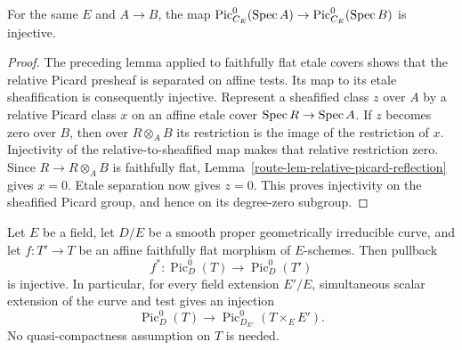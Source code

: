 \begin{lemma}
  \label{route-lem-pic0-affine-reflection}

  For the same \(E\) and \(A\to B\), the map
  \(\operatorname{Pic}^0_{C_E}(\operatorname{Spec} A)\to
    \operatorname{Pic}^0_{C_E}(\operatorname{Spec} B)\) is injective.
\end{lemma}

\begin{proof}
  The preceding lemma applied to faithfully flat etale covers shows that
  the relative Picard presheaf is separated on affine tests.  Its map to
  its etale sheafification is consequently injective.  Represent a
  sheafified class \(z\) over \(A\) by a relative Picard class \(x\)
  on an affine etale cover \(\operatorname{Spec} R\to\operatorname{Spec} A\).
  If \(z\) becomes zero over \(B\), then over \(R\otimes_A B\) its
  restriction is the image of the restriction of \(x\).
  Injectivity of the relative-to-sheafified map makes that relative
  restriction zero.  Since \(R\to R\otimes_A B\) is faithfully flat,
  Lemma~\ref{route-lem-relative-picard-reflection} gives \(x=0\).
  Etale separation now gives \(z=0\).  This proves injectivity on the
  sheafified Picard group, and hence on its degree-zero subgroup.
\end{proof}

\begin{lemma}
  \label{route-lem-pic0-field-reflection}
  \leanok

  Let \(E\) be a field, let \(D/E\) be a smooth proper geometrically
  irreducible curve, and let \(f:T'\to T\) be an affine faithfully
  flat morphism of \(E\)-schemes. Then pullback
  \[
    f^*:\operatorname{Pic}^0_D(T)\longrightarrow
      \operatorname{Pic}^0_D(T')
  \]
  is injective. In particular, for every field extension \(E'/E\),
  simultaneous scalar extension of the curve and test gives an injection
  \[
    \operatorname{Pic}^0_D(T)\longrightarrow
       \operatorname{Pic}^0_{D_{E'}}(T\times_E E').
  \]
  No quasi-compactness assumption on \(T\) is needed.
\end{lemma}

